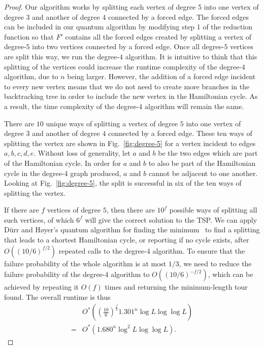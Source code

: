 \begin{proof}
Our algorithm works by splitting each vertex of degree 5 into one vertex of degree $3$ and another of degree $4$ connected by a forced edge. The forced edges can be included in our quantum algorithm by modifying step 1 of the reduction function so that $F'$ contains all the forced edges created by splitting a vertex of degree-$5$ into two vertices connected by a forced edge. Once all degree-$5$ vertices are split this way, we run the degree-$4$ algorithm. It is intuitive to think that this splitting of the vertices could increase the runtime complexity of the degree-$4$ algorithm, due to $n$ being larger. However, the addition of a forced edge incident to every new vertex means that we do not need to create more branches in the backtracking tree in order to include the new vertex in the Hamiltonian cycle. As a result, the time complexity of the degree-$4$ algorithm will remain the same.

There are $10$ unique ways of splitting a vertex of degree $5$ into one vertex of degree $3$ and another of degree $4$ connected by a forced edge. These ten ways of splitting the vertex are shown in Fig.\ \ref{fig:degree-5} for a vertex incident to edges $a,b,c,d,e$. Without loss of generality, let $a$ and $b$ be the two edges which are part of the Hamiltonian cycle. In order for $a$ and $b$ to also be part of the Hamiltonian cycle in the degree-4 graph produced, $a$ and $b$ cannot be adjacent to one another. Looking at Fig.\ \ref{fig:degree-5}, the split is successful in six of the ten ways of splitting the vertex.

If there are $f$ vertices of degree $5$, then there are $10^f$ possible ways of splitting all such vertices, of which $6^f$ will give the correct solution to the TSP. We can apply D\"urr and H\o yer's quantum algorithm for finding the minimum~\cite{durr1996} to find a splitting that leads to a shortest Hamiltonian cycle, or reporting if no cycle exists, after $O((10/6)^{f/2})$ repeated calls to the degree-4 algorithm. To ensure that the failure probability of the whole algorithm is at most $1/3$, we need to reduce the failure probability of the degree-4 algorithm to $O((10/6)^{-f/2})$, which can be achieved by repeating it $O(f)$ times and returning the minimum-length tour found. The overall runtime is thus
%
\begin{align}
&O^*\left(\left(\frac{10}{6}\right)^{\frac{f}{2}}1.301^n\log L \log \log L\right)\\
 = &O^*(1.680^n\log^2 L \log \log L).
\end{align}
\end{proof}
